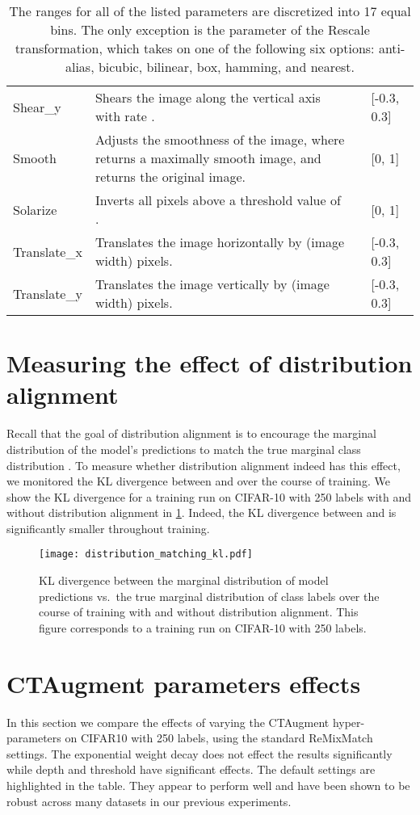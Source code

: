 \documentclass{article} \usepackage{iclr2020_conference,times}
\begin{document}
\begin{table}[h!]
\begin{tabular}{lp{7cm}lp{2cm}}
Shear\_y     &Shears the image along the vertical axis with rate .&          & [-0.3, 0.3]     \\
Smooth       &Adjusts the smoothness of the image, where  returns a maximally smooth image, and  returns the original image.&&[0, 1]\\
Solarize     &Inverts all pixels above a threshold value of .        &           & [0, 1]    \\
Translate\_x &Translates the image horizontally by (image width) pixels.  &    &[-0.3, 0.3]\\
Translate\_y &Translates the image vertically by (image width) pixels.  &    &[-0.3, 0.3]\\
\bottomrule
\end{tabular}
\caption{The ranges for all of the listed parameters are discretized into 17 equal bins. The only exception is the  parameter of the Rescale transformation, which takes on one of the following six options: anti-alias, bicubic, bilinear, box, hamming, and nearest.}   
\end{table}

\section{Measuring the effect of distribution alignment}
\label{sec:dm_kl}

Recall that the goal of distribution alignment is to encourage the marginal distribution of the model's predictions  to match the true marginal class distribution .
To measure whether distribution alignment indeed has this effect, we monitored the KL divergence between  and  over the course of training.
We show the KL divergence for a training run on CIFAR-10 with 250 labels with and without distribution alignment in \cref{fig:distribution_alignment_kl}.
Indeed, the KL divergence between  and  is significantly smaller throughout training.

\begin{figure}
    \centering
    \texttt{[image: distribution\_matching\_kl.pdf]}
    \caption{KL divergence between the marginal distribution of model predictions vs.\ the true marginal distribution of class labels over the course of training with and without distribution alignment.
    This figure corresponds to a training run on CIFAR-10 with 250 labels.
    }
    \label{fig:distribution_alignment_kl}
\end{figure}


\section{CTAugment parameters effects}
In this section we compare the effects of varying the CTAugment hyper-parameters on CIFAR10 with 250 labels, using the standard ReMixMatch settings.
The exponential weight decay  does not effect the results significantly while depth and threshold have significant effects.
The default settings are highlighted in the table. 
They appear to perform well and have been shown to be robust across many datasets in our previous experiments.
\end{document}

